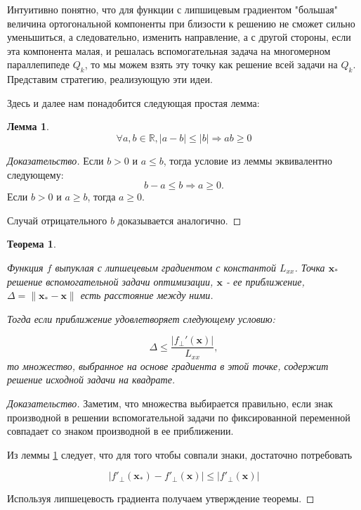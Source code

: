 \documentclass[12pt]{article}
\newtheorem{theorem}{Теорема}[section]
\newtheorem{lemma}{Лемма}[section]
\begin{document}
Интуитивно понятно, что для функции с липшицевым градиентом "большая" величина ортогональной компоненты при близости к решению не сможет сильно уменьшиться, а следовательно, изменить направление, а с другой стороны, если эта компонента малая, и решалась вспомогательная задача на многомерном параллепипеде $Q_k$, то мы можем взять эту точку как решение всей задачи на $Q_k$. Представим стратегию, реализующую эти идеи. 

Здесь и далее нам понадобится следующая простая лемма:

\begin{lemma}
\label{trick_lemma}
$$\forall a,b\in\mathbb{R}, |a-b|\leq |b| \Rightarrow ab \geq 0$$
\end{lemma}
\begin{proof}[Доказательство]
Если $b>0$ и $a\leq b$, тогда условие из леммы эквивалентно следующему:
$$b-a\leq b\Rightarrow a\geq 0.$$
Если $b>0$ и $a \geq b$, тогда $a\geq 0$.

Случай отрицательного $b$ доказывается аналогично.
\end{proof}

\begin{theorem}
\label{CurGrad}

Функция $f$ выпуклая с липшецевым градиентом с константой $L_{xx}$. Точка $\textbf{x}_*$ решение вспомогательной задачи оптимизации, $\textbf{x}$ - ее приближение, $\Delta = \|\textbf{x}_*-\textbf{x}\|$ есть расстояние между ними.

Тогда если приближение удовлетворяет следующему условию:

$$\Delta \leq \frac{|f_\perp'(\textbf{x})|}{L_{xx}},$$
то множество, выбранное на основе градиента в этой точке, содержит решение исходной задачи на квадрате. 
\end{theorem}
\begin{proof}[Доказательство]

Заметим, что множества выбирается правильно, если знак производной в решении вспомогательной задачи по фиксированной переменной совпадает со знаком производной в ее приближении.

Из леммы \ref{trick_lemma} следует, что для того чтобы совпали знаки, достаточно потребовать

$$\left|f'_\perp(\textbf{x}_*) - f'_\perp(\textbf{x})\right| \leq |f'_\perp(\textbf{x})|$$

Используя липшецевость градиента получаем утверждение теоремы.
\end{proof}
\end{document}
